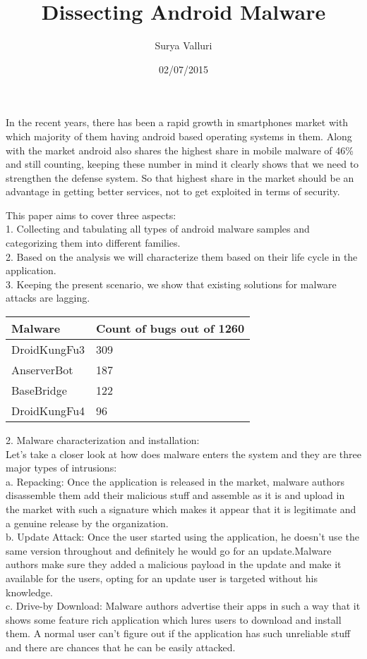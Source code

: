 \documentclass{article}
\title{Dissecting Android Malware}
\author{Surya Valluri}
\date{02/07/2015}
\begin{document}
\maketitle
In the recent years, there has been a rapid growth in smartphones market with which majority of them having android based operating systems in them. Along with the market android also shares the highest share in mobile malware of 46\% and still counting, keeping these number in mind it clearly shows that we need to strengthen the defense system. So that highest share in the market should be an advantage in getting better services, not to get exploited in terms of security.

This paper aims to cover three aspects: \\
1. Collecting and tabulating all types of android malware samples and categorizing them into different families. \\
2. Based on the analysis we will characterize them based on their life cycle in the application.\\
3. Keeping the present scenario, we show that existing solutions for malware attacks are lagging.\\

\begin{center}
\begin{tabular}{ |p{3cm}||p{3cm}| }
\hline
Malware & Count of bugs out of 1260 \\ 
\hline
DroidKungFu3 & 309 \\ 
\hline
AnserverBot & 187 \\ 
\hline
BaseBridge & 122\\
\hline
DroidKungFu4 & 96\\
\hline
\end{tabular}
\end{center}


2. Malware characterization and installation:\\
Let's take a closer look at how does malware enters the system and they are three major types of intrusions:\\
a. Repacking: Once the application is released in the market, malware authors disassemble them add their malicious stuff and assemble as it is and upload in the market with such a signature which makes it appear that it is legitimate and a genuine release by the organization.\\
b. Update Attack: Once the user started using the application, he doesn't use the same version throughout and definitely he would go for an update.Malware authors make sure they added a malicious payload in the update and make it available for the users, opting for an update user is targeted without his knowledge.\\
c. Drive-by Download: Malware authors advertise their apps in such a way that it shows some feature rich application which lures users to download and install them. A normal user can't figure out if the application has such unreliable stuff and there are chances that he can be easily attacked.\\
\end{document}
